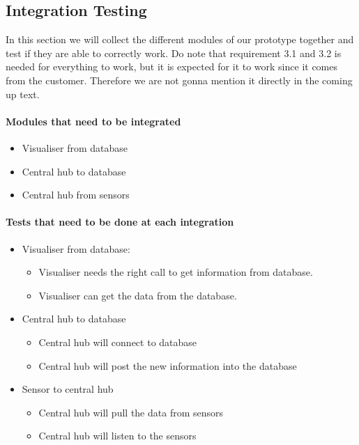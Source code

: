 \documentclass[../document]{subfiles}
\begin{document}
\subsection{Integration Testing}
In this section we will collect the different modules of our prototype together and test if they are able to correctly work. Do note that requirement 3.1 and 3.2 is needed for everything to work, but it is expected for it to work since it comes from the customer. Therefore we are not gonna mention it directly in the coming up text.

\paragraph{Modules that need to be integrated}
\begin{itemize}
	\item
	Visualiser from database
	\item
	Central hub to database
	\item
	Central hub from sensors
\end{itemize}

\paragraph{Tests that need to be done at each integration}
\begin{itemize}
	\item
	Visualiser from database:
	\begin{itemize}
		\item
		Visualiser needs the right call to get information from database.
		\item
		Visualiser can get the data from the database.
	\end{itemize}
	\item
	Central hub to database
	\begin{itemize}
		\item
		Central hub will connect to database
		\item
		Central hub will post the new information into the database
	\end{itemize}
	\item
	Sensor to central hub
	\begin{itemize}
		\item
		Central hub will pull the data from sensors
		\item
		Central hub will listen to the sensors
	\end{itemize}
\end{itemize}
\end{document}

